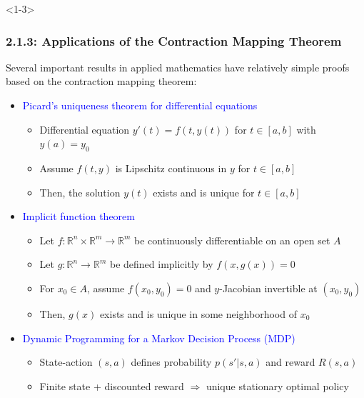 \documentclass[10pt,english,aspectratio=169]{beamer}
\begin{document}
\begin{frame}<1-3> \frametitle{2.1.3: Applications of the Contraction Mapping Theorem}

Several important results in applied mathematics have relatively simple proofs based on the contraction mapping theorem:
\vspace{1mm}

\begin{itemize}
\setlength\itemsep{3mm}
\item<1-> \textcolor{blue}{Picard's uniqueness theorem for differential equations} \vspace{1mm}
\begin{itemize} 
  \setlength\itemsep{1.5mm}
  \item Differential equation $y'(t) = f(t,y(t))$ for $t\in [a,b]$ with $y(a)=y_0$ 
  \item  Assume $f(t,y)$ is Lipschitz continuous in $y$ for $t\in [a,b]$
  \item Then, the solution $y(t)$ exists and is unique for $t\in [a,b]$
\end{itemize}
\item<2-> \textcolor{blue}{Implicit function theorem} \vspace{1mm}
\begin{itemize} 
  \setlength\itemsep{1.5mm}
  \item Let $f\colon \mathbb{R}^n \times \mathbb{R}^{m} \to \mathbb{R}^m$ be continuously differentiable on an open set $A$
  \item Let $g\colon \mathbb{R}^n \to \mathbb{R}^{m}$ be defined implicitly by $f(x,g(x))=0$
  \item For $x_0\in A$, assume $f(x_0,y_0)=0$ and $y$-Jacobian invertible at $(x_0,y_0)$
  \item Then, $g(x)$ exists and is unique in some neighborhood of $x_0$
\end{itemize}
\item<3-> \textcolor{blue}{Dynamic Programming for a Markov Decision Process (MDP)} \vspace{1mm}
\begin{itemize} 
  \setlength\itemsep{1.5mm}
  \item State-action $(s,a)$ defines probability $p(s'|s,a)$ and reward $R(s,a)$
  \item Finite state + discounted reward $\Rightarrow$ unique stationary optimal policy
\end{itemize}
\end{itemize}


\end{frame}
\end{document}
